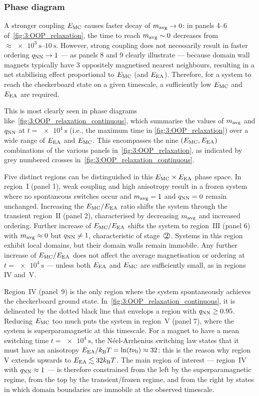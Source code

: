 \subsubsection{Phase diagram}
A stronger coupling $E_\mathrm{MC}$ causes faster decay of $m_\mathrm{avg} \rightarrow 0$: in panels 4--6 of~\cref{fig:3:OOP_relaxation}, the time to reach $m_\mathrm{avg} \sim 0$ decreases from $\approx \SIrange{e3}{10}{\second}$.
However, strong coupling does not necessarily result in faster ordering $q_\mathrm{NN} \rightarrow 1$ --- as panels 8 and 9 clearly illustrate --- because domain wall magnets typically have 3 oppositely magnetised nearest neighbours, resulting in a net stabilising effect proportional to $E_\mathrm{MC}$ (and $E_\mathrm{EA}$).
Therefore, for a system to reach the checkerboard state on a given timescale, a sufficiently low $E_\mathrm{MC}$ and $E_\mathrm{EA}$ are required. \par
This is most clearly seen in phase diagrams like~\cref{fig:3:OOP_relaxation_continuous}, which summarise the values of $m_\mathrm{avg}$ and $q_\mathrm{NN}$ at $t = \SI{e4}{\second}$ (i.e., the maximum time in \cref{fig:3:OOP_relaxation}) over a wide range of $E_\mathrm{EA}$ and $E_\mathrm{MC}$.
This encompasses the nine $(E_\mathrm{MC},E_\mathrm{EA})$ combinations of the various panels in~\cref{fig:3:OOP_relaxation}, as indicated by grey numbered crosses in~\cref{fig:3:OOP_relaxation_continuous}. \par
Five distinct regions can be distinguished in this $E_\mathrm{MC} \times E_\mathrm{EA}$ phase space.
In region~$\mathrm{I}$ (panel 1), weak coupling and high anisotropy result in a frozen system where no spontaneous switches occur and $m_\mathrm{avg} = 1$ and $q_\mathrm{NN} = 0$ remain unchanged.
Increasing the $E_\mathrm{MC}/E_\mathrm{EA}$ ratio shifts the system through the transient region~$\mathrm{II}$ (panel 2), characterised by decreasing $m_\mathrm{avg}$ and increased ordering.
Further increase of $E_\mathrm{MC}/E_\mathrm{EA}$ shifts the system to region~$\mathrm{III}$ (panel 6) with $m_\mathrm{avg} \approx 0$ but $q_\mathrm{NN} \neq 1$, characteristic of stage~$\circled{2}$.
Systems in this region exhibit local domains, but their domain walls remain immobile.
Any further increase of $E_\mathrm{MC}/E_\mathrm{EA}$ does not affect the average magnetisation or ordering at $t = \SI{e4}{\second}$ --- unless both $E_\mathrm{EA}$ and $E_\mathrm{MC}$ are sufficiently small, as in regions~$\mathrm{IV}$ and~$\mathrm{V}$. \par
Region~$\mathrm{IV}$ (panel~9) is the only region where the system spontaneously achieves the checkerboard ground state.
In~\cref{fig:3:OOP_relaxation_continuous}, it is delineated by the dotted black line that envelops a region with $q_\mathrm{NN} \geq 0.95$.
Reducing $E_\mathrm{MC}$ too much puts the system in region~$\mathrm{V}$ (panel 7), where the system is superparamagnetic at this timescale.
For a magnet to have a mean switching time $t = \SI{e4}{\second}$, the N\'eel-Arrhenius switching law states that it must have an anisotropy $\EEA/\kBT = \ln(t \nu_0) \approx 32$: this is the reason why region~$\mathrm{V}$ extends upwards to $\EEA \lesssim 32 \kBT$.
The main region of interest --- region~$\mathrm{IV}$ with $q_\mathrm{NN} \approx 1$ --- is therefore constrained from the left by the superparamagnetic regime, from the top by the transient/frozen regime, and from the right by states in which domain boundaries are immobile at the observed timescale.

